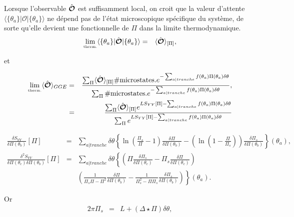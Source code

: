 	Lorsque l'observable $\hat{\bm{\mathcal{O}}}$ est suffisamment local, on croit que la valeur d'attente $\langle  \{ \theta_a\}  \vert   \mathcal{O} \vert \{ \theta_a\} \rangle$ ne dépend pas de l'état microscopique spécifique du système, de sorte qu'elle devient une fonctionnelle de $\Pi$ dans la limite thermodynamique.
	\begin{eqnarray}
		\underset{\mbox{\tiny therm.}}{\lim} \langle  \{ \theta_a\}  \vert   \hat{\bm{\mathcal{O}}} \vert \{ \theta_a\} \rangle & = & \langle \hat{\bm{\mathcal{O}}}\rangle_{[\Pi]},
	\end{eqnarray}
	
	et 
	
	\begin{eqnarray}
		\underset{\mbox{\tiny therm.}}{\lim} \langle \hat{\bm{\mathcal{O}}} \rangle_{GGE} & =  & \frac{ \sum_{\Pi}  \langle \hat{\bm{\mathcal{O}}}\rangle_{[\Pi]} \# \mbox{microstates.} e^{- \sum_{a \vert tranche} f(\theta_a) \Pi ( \theta_a )  \delta \theta}    }{\sum_{\Pi} \# \mbox{microstates.}  e^{- \sum_{a \vert tranche }  f(\theta_a) \Pi ( \theta_a ) \delta \theta } },\\
		& = & \frac{ \sum_{\Pi}  \langle \hat{\bm{\mathcal{O}}}\rangle_{[\Pi]}  e^{ L S_{YY}[\Pi]- \sum_{a \vert tranche} f(\theta_a) \Pi ( \theta_a )  \delta \theta}    }{\sum_{\Pi}  e^{ L S_{YY}[\Pi] - \sum_{a \vert tranche }  f(\theta_a) \Pi ( \theta_a ) \delta \theta } }
	\end{eqnarray}
	
	\begin{eqnarray}
			\frac{ \delta S_{YY} }{ \delta \Pi(\theta_b)  } [\Pi ]  & = & \sum_{a\vert tranche}   \delta \theta \left \{ \ln \left ( \frac{ \Pi_s}{ \Pi  } - 1 \right )\frac{\delta \Pi  }{ \delta \Pi(\theta_b)} -  \left ( \ln \left ( 1 - \frac{ \Pi}{ \Pi_s }\right ) \right )\frac{\delta \Pi_s  }{ \delta \Pi(\theta_b) } \right \} (\theta_a) ,\\
			\frac{ \delta^2 S_{YY} }{ \delta \Pi(\theta_c) \delta \Pi(\theta_b)  } [\Pi ]  & = & 	\sum_{a \vert tranche}   \delta \theta \left \{ \left ( \Pi  \frac{\delta \Pi_s  }{\delta \Pi ( \theta_c) }- \Pi_s  \frac{\delta \Pi  }{\delta \Pi ( \theta_c ) } \right ) \right.   \\
			&&   \left. \left ( \frac{1}{\Pi_s\Pi  -\Pi^2  }\frac{\delta \Pi }{\delta \Pi(\theta_b) }- \frac{1}{\Pi_s^2  - \Pi \Pi_s }\frac{\delta \Pi_s }{\delta \Pi(\theta_b) } \right )  \right \}(\theta_a).
		\end{eqnarray}
		
	Or 
	\begin{eqnarray}
		2\pi \Pi_s  & = &  L + ( \Delta \star \Pi ) \delta \theta, 		
	\end{eqnarray}
	
